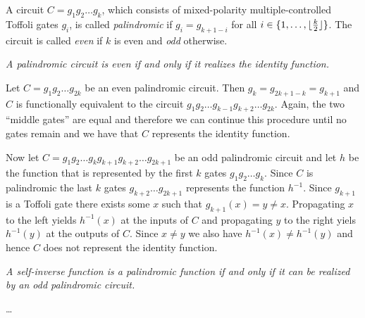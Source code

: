 \medskip {}\enspace A circuit
$C=g_1g_2\dots g_k$, which consists of mixed-polarity multiple-controlled
Toffoli gates $g_i$, is called {\it palindromic\/} if $ g_i = g_{k+1-i}$ for all
$i \in \{1,\dots,\lfloor{k\over 2}\rfloor\}$.  The circuit is called {\it
even\/} if $k$ is even and {\it odd\/} otherwise.

\smallskip {} \sl A palindromic circuit is even if and only
if it realizes the identity function. \rm

\smallskip{} Let $C=g_1g_2\dots g_{2k}$ be an even
palindromic circuit.  Then $g_{k}=g_{2k+1-k}=g_{k+1}$ and $C$ is functionally
equivalent to the circuit $g_1g_2\dots g_{k-1}g_{k+2} \dots g_{2k}$.  Again, the
two ``middle gates'' are equal and therefore we can continue this procedure
until no gates remain and we have that $C$ represents the identity function.

Now let $C=g_1g_2\dots g_kg_{k+1}g_{k+2}\dots g_{2k+1}$ be an odd palindromic
circuit and let $h$ be the function that is represented by the first $k$ gates
$g_1g_2\dots g_k$.  Since $C$ is palindromic the last $k$ gates $g_{k+2}\dots
g_{2k+1}$ represents the function $h^{-1}$.  Since $g_{k+1}$ is a Toffoli gate
there exists some $x$ such that $g_{k+1}(x)=y\neq x$.  Propagating $x$ to the
left yields $h^{-1}(x)$ at the inputs of $C$ and propagating $y$ to the right
yiels $h^{-1}(y)$ at the outputs of $C$.  Since $x\neq y$ we also have
$h^{-1}(x)\neq h^{-1}(y)$ and hence $C$ does not represent the identity
function.\qquad\slug

 \sl A self-inverse function is a palindromic function if
and only if it can be realized by an odd palindromic circuit. \rm

\smallskip{} \dots





